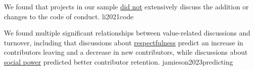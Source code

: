 \documentclass{article}
\begin{document}


  {We found that projects in our sample \ul{did not} extensively discuss the addition or changes to the code of conduct.}
  {li2021code}

  {We found multiple significant relationships between value-related discussions and turnover, including that discussions about \ul{respectfulness} predict an increase in contributors leaving and a decrease in new contributors, while discussions about \ul{social power} predicted better contributor retention.}
  {jamieson2023predicting}

\end{document}
